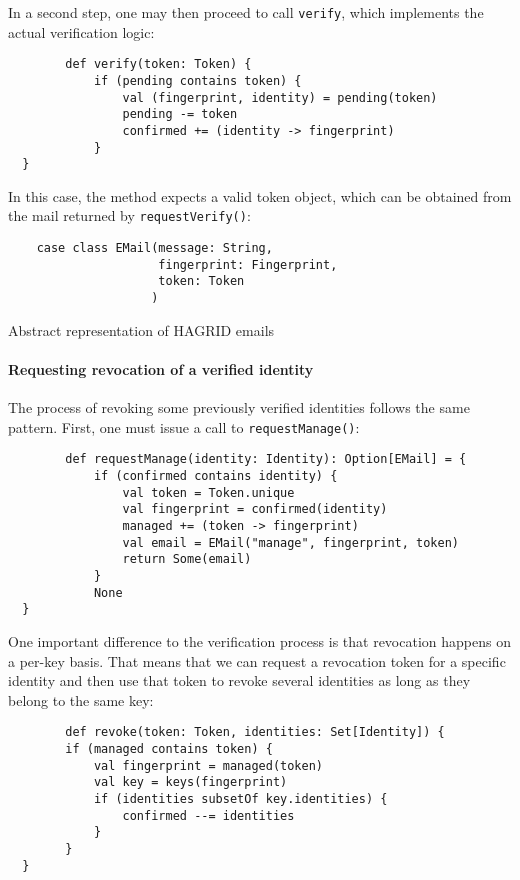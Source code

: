 In a second step, one may then proceed to call \texttt{verify}, which implements the actual verification logic: 
\begin{code}
    \begin{verbatim}
        def verify(token: Token) {
            if (pending contains token) {
                val (fingerprint, identity) = pending(token)
                pending -= token
                confirmed += (identity -> fingerprint)
            }
  }
    \end{verbatim}
    
\end{code}
In this case, the method expects a valid token object, which can be obtained from the mail returned by \texttt{requestVerify()}: 
\begin{code}
    \begin{verbatim}
    case class EMail(message: String, 
                     fingerprint: Fingerprint, 
                     token: Token
                    )
    \end{verbatim}
    \caption{Abstract representation of HAGRID emails}
\end{code}

\paragraph{Requesting revocation of a verified identity} The process of revoking some previously verified identities follows the same pattern. First, one must issue a call to \texttt{requestManage()}: 
\begin{code}
    \begin{verbatim}
        def requestManage(identity: Identity): Option[EMail] = {
            if (confirmed contains identity) {
                val token = Token.unique
                val fingerprint = confirmed(identity)
                managed += (token -> fingerprint)
                val email = EMail("manage", fingerprint, token)
                return Some(email)
            }
            None
  }
    \end{verbatim}
\end{code}
One important difference to the verification process is that revocation happens on a per-key basis. That means that we can request a revocation token for a specific identity and then use that token to revoke several identities as long as they belong to the same key: 
\begin{code}
    \begin{verbatim}
        def revoke(token: Token, identities: Set[Identity]) {
        if (managed contains token) {
            val fingerprint = managed(token)
            val key = keys(fingerprint)
            if (identities subsetOf key.identities) {
                confirmed --= identities
            }
        }
  }
    \end{verbatim}
\end{code}

